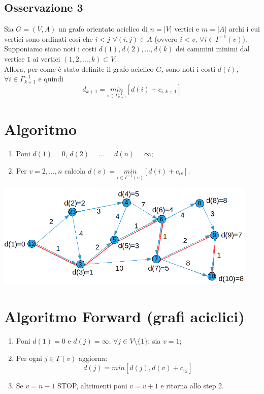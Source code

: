 \subsection{Osservazione 3}
Sia $G=(V,A)$ un grafo orientato aciclico di $n=|V|$ vertici e $m=|A|$ archi i cui vertici sono ordinati così che $i<j$ $\forall(i,j)\in A$ (ovvero $i<v$, $\forall i\in\Gamma^{-1}(v)$).\\
Supponiamo siano noti i costi $d(1),d(2),\dots,d(k)$ dei cammini minimi dal vertice $1$ ai vertici $(1,2,\dots,k)\subset V$.\\
Allora, per come è stato definite il grafo aciclico $G$, sono noti i costi $d(i)$, $\forall i\in\Gamma^{-1}_{k+1}$ e quindi
\begin{equation}
	d_{k+1}=\underset{i\in\Gamma^{-1}_{k+1}}{min}[d(i)+c_{i,k+1}]
\end{equation}

\section{Algoritmo}
\begin{enumerate}
	\item Poni $d(1)=0$, $d(2)=\dots=d(n)=\infty$;
	\item Per $v=2,\dots,n$ calcola $d(v)=\underset{i\in\Gamma^{-1}(v)}{min}[d(i)+c_{iv}]$.
\end{enumerate}
\centerline{\includegraphics[height=5cm]{images/graph38.png}}

\section{Algoritmo Forward (grafi aciclici)}
\begin{enumerate}
	\item Poni $d(1)=0$ e $d(j)=\infty$, $\forall j\in V\setminus\{1\}$; sia $v=1$;
	\item Per ogni $j\in\Gamma(v)$ aggiorna:
	\begin{equation}
		d(j)=min[d(j),d(v)+c_{vj}]
	\end{equation}
	\item Se $v=n-1$ STOP, altrimenti poni $v=v+1$ e ritorna allo step 2.
\end{enumerate}

